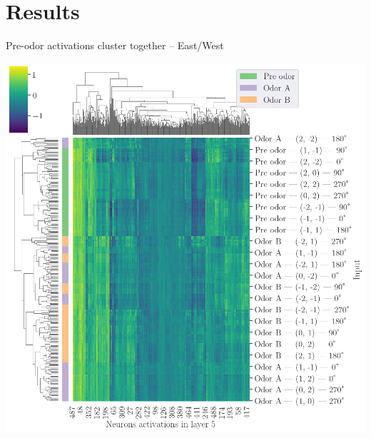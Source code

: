 \documentclass[bigger]{beamer}
\begin{document}
\section{Results}
\label{sec:org9a2b5c4}
\begin{frame}[label={sec:org8bb0ba1}]{Pre-odor activations cluster together -- East/West}
\begin{center}
\includegraphics[height=0.9\textheight]{medias/activations-learned-EastWest.png}
\end{center}
\end{frame}
\end{document}
